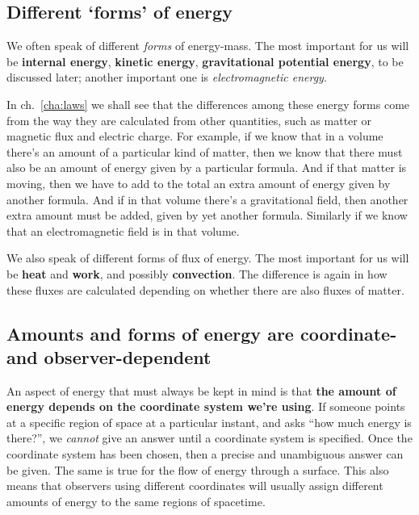 \documentclass[a4paper,12pt,%
onecolumn,oneside,titlepage,%
british%
]{memoir}
\renewcommand*{\|}[1][]{\nonscript\:#1\vert\nonscript\:\mathopen{}}
\newcommand*{\chap}{ch.}%
\newcommand*{\energym}{energy-mass}
\begin{document}
\subsection{Different \enquote*{forms} of energy}
\label{sec:forms_energy}

We often speak of different \emph{forms} of \energym. The most important for us will be \textbf{internal energy}, \textbf{kinetic energy}, \textbf{gravitational potential energy}, to be discussed later; another important one is \emph{electromagnetic energy}.

In \chap~\ref{cha:laws} we shall see that the differences among these energy forms come from the way they are calculated from other quantities, such as matter or magnetic flux and electric charge. For example, if we know that in a volume there's an amount of a particular kind of matter, then we know that there must also be an amount of energy given by a particular formula. And if that matter is moving, then we have to add to the total an extra amount of energy given by another formula. And if in that volume there's a gravitational field, then another extra amount must be added, given by yet another formula. Similarly if we know that an electromagnetic field is in that volume.

We also speak of different forms of flux of energy. The most important for us will be \textbf{heat} and \textbf{work}, and possibly \textbf{convection}. The difference is again in how these fluxes are calculated depending on whether there are also fluxes of matter.

\subsection{Amounts and forms of energy are coordinate- and observer-dependent}
\label{sec:energy_coords}

An aspect of energy that must always be kept in mind is that \textbf{the amount of energy depends on the coordinate system we're using}. If someone points at a specific region of space at a particular instant, and asks \enquote{how much energy is there?}, we \emph{cannot} give an answer until a coordinate system is specified. Once the coordinate system has been chosen, then a precise and unambiguous answer can be given. The same is true for the flow of energy through a surface. This also means that observers using different coordinates will usually assign different amounts of energy to the same regions of spacetime.
\end{document}
